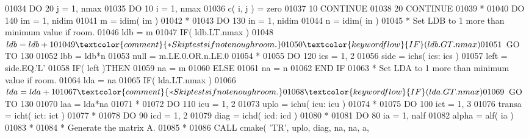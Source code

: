 \begin{DoxyCode}
01034       \textcolor{keywordflow}{DO} 20 j = 1, nmax
01035          \textcolor{keywordflow}{DO} 10 i = 1, nmax
01036             c( i, j ) = zero
01037    10    \textcolor{keywordflow}{CONTINUE}
01038    20 \textcolor{keywordflow}{CONTINUE}
01039 \textcolor{comment}{*}
01040       \textcolor{keywordflow}{DO} 140 im = 1, nidim
01041          m = idim( im )
01042 \textcolor{comment}{*}
01043          \textcolor{keywordflow}{DO} 130 in = 1, nidim
01044             n = idim( in )
01045 \textcolor{comment}{*           Set LDB to 1 more than minimum value if room.}
01046             ldb = m
01047             \textcolor{keywordflow}{IF}( ldb.LT.nmax )
01048      $         ldb = ldb + 1
01049 \textcolor{comment}{*           Skip tests if not enough room.}
01050             \textcolor{keywordflow}{IF}( ldb.GT.nmax )
01051      $         \textcolor{keywordflow}{GO TO} 130
01052             lbb = ldb*n
01053             null = m.LE.0.OR.n.LE.0
01054 \textcolor{comment}{*}
01055             \textcolor{keywordflow}{DO} 120 ics = 1, 2
01056                side = ichs( ics: ics )
01057                left = side.EQ.\textcolor{stringliteral}{'L'}
01058                \textcolor{keywordflow}{IF}( left )\textcolor{keywordflow}{THEN}
01059                   na = m
01060                \textcolor{keywordflow}{ELSE}
01061                   na = n
01062 \textcolor{keywordflow}{               END IF}
01063 \textcolor{comment}{*              Set LDA to 1 more than minimum value if room.}
01064                lda = na
01065                \textcolor{keywordflow}{IF}( lda.LT.nmax )
01066      $            lda = lda + 1
01067 \textcolor{comment}{*              Skip tests if not enough room.}
01068                \textcolor{keywordflow}{IF}( lda.GT.nmax )
01069      $            \textcolor{keywordflow}{GO TO} 130
01070                laa = lda*na
01071 \textcolor{comment}{*}
01072                \textcolor{keywordflow}{DO} 110 icu = 1, 2
01073                   uplo = ichu( icu: icu )
01074 \textcolor{comment}{*}
01075                   \textcolor{keywordflow}{DO} 100 ict = 1, 3
01076                      transa = icht( ict: ict )
01077 \textcolor{comment}{*}
01078                      \textcolor{keywordflow}{DO} 90 icd = 1, 2
01079                         diag = ichd( icd: icd )
01080 \textcolor{comment}{*}
01081                         \textcolor{keywordflow}{DO} 80 ia = 1, nalf
01082                            alpha = alf( ia )
01083 \textcolor{comment}{*}
01084 \textcolor{comment}{*                          Generate the matrix A.}
01085 \textcolor{comment}{*}
01086                            \textcolor{keyword}{CALL }cmake( \textcolor{stringliteral}{'TR'}, uplo, diag, na, na, a,

\end{DoxyCode}
